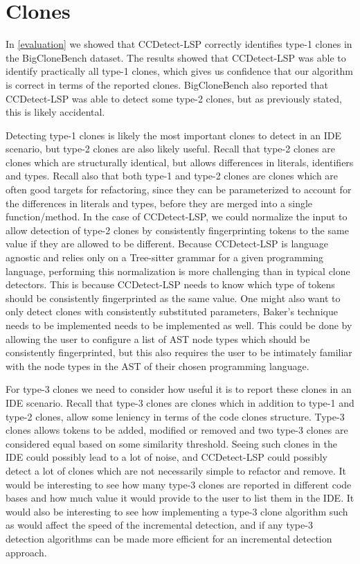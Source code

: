 \section{Clones}

In \cref{evaluation} we showed that CCDetect-LSP correctly identifies type-1 clones in the
BigCloneBench dataset. The results showed that CCDetect-LSP was able to identify
practically all type-1 clones, which gives us confidence that our algorithm is correct in
terms of the reported clones. BigCloneBench also reported that CCDetect-LSP was able to
detect some type-2 clones, but as previously stated, this is likely accidental.

Detecting type-1 clones is likely the most important clones to detect in an IDE scenario,
but type-2 clones are also likely useful. Recall that type-2 clones are clones which are
structurally identical, but allows differences in literals, identifiers and types. Recall
also that both type-1 and type-2 clones are clones which are often good targets for
refactoring, since they can be parameterized to account for the differences in literals
and types, before they are merged into a single function/method. In the case of
CCDetect-LSP, we could normalize the input to allow detection of type-2 clones by
consistently fingerprinting tokens to the same value if they are allowed to be different.
Because CCDetect-LSP is language agnostic and relies only on a Tree-sitter grammar for a
given programming language, performing this normalization is more challenging than in
typical clone detectors. This is because CCDetect-LSP needs to know which type of tokens
should be consistently fingerprinted as the same value. One might also want to only detect
clones with consistently substituted parameters, Baker's technique needs to be
implemented\cite{bakerdup} needs to be implemented as well. This could be done by allowing
the user to configure a list of AST node types which should be consistently fingerprinted,
but this also requires the user to be intimately familiar with the node types in the AST
of their chosen programming language.

For type-3 clones we need to consider how useful it is to report these clones in an IDE
scenario. Recall that type-3 clones are clones which in addition to type-1 and type-2
clones, allow some leniency in terms of the code clones structure. Type-3 clones allows
tokens to be added, modified or removed and two type-3 clones are considered equal based
on some similarity threshold. Seeing such clones in the IDE could possibly lead to a lot
of noise, and CCDetect-LSP could possibly detect a lot of clones which are not necessarily
simple to refactor and remove. It would be interesting to see how many type-3 clones are
reported in different code bases and how much value it would provide to the user to list
them in the IDE. It would also be interesting to see how implementing a type-3 clone
algorithm such as \cite{bakertype-3} would affect the speed of the incremental detection,
and if any type-3 detection algorithms can be made more efficient for an incremental
detection approach.

